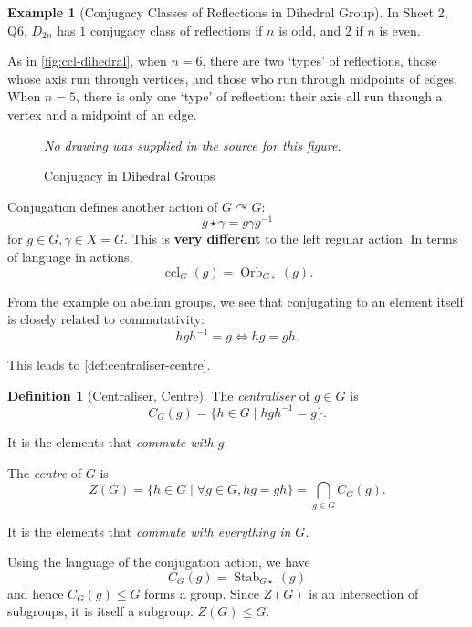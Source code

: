 \documentclass{article}
\theoremstyle{definition}
\newtheorem{definition}[theorem]{Definition}
\newtheorem*{example*}{Example}
\theoremstyle{remark}
\newcommand{\pqty}[1]{\left(#1\right)}
\newcommand{\set}[2]{\{#1\mid #2\}}
\newcommand{\inverse}{^{-1}}
\newcommand{\subgroup}{\leq}
\newcommand{\actson}{\curvearrowright}
\newcommand{\Stab}{\operatorname{Stab}}
\newcommand{\ccl}{\operatorname{ccl}}
\newcommand{\Orb}{\operatorname{Orb}}
\begin{document}
\begin{example*}[Conjugacy Classes of Reflections in Dihedral Group]
    In Sheet 2, Q6, \(D_{2n}\) has \(1\) conjugacy class of reflections if \(n\) is odd, and \(2\) if \(n\) is even.
    
    As in \autoref{fig:ccl-dihedral}, when \(n = 6\), there are two `types' of reflections, those whose axis run through vertices, and those who run through midpoints of edges. When \(n = 5\), there is only one `type' of reflection: their axis all run through a vertex and a midpoint of an edge.
\end{example*}

\begin{figure}[ht!]
    \centering
    \emph{No drawing was supplied in the source for this figure.}\par
\caption{Conjugacy in Dihedral Groups}
    \label{fig:ccl-dihedral}
\end{figure}

Conjugation defines another action of \(G \actson G\):
\[
    g \star \gamma = g \gamma g\inverse
\]
for \(g \in G, \gamma \in X = G\). This is \textbf{very different} to the left regular action. In terms of language in actions,
\[
    \ccl_{G} \pqty{g} = \Orb_{G\star} \pqty{g}.
\]

From the example on abelian groups, we see that conjugating to an element itself is closely related to commutativity:
\[
    hgh\inverse = g \iff hg = gh.
\]

This leads to \autoref{def:centraliser-centre}.

\begin{definition}[Centraliser, Centre]
    \label{def:centraliser-centre}%
    The \emph{centraliser} of \(g \in G\) is
    \[
        C_G\pqty{g} = \set{h \in G}{h g h\inverse = g}.
    \]

    It is the elements that \emph{commute with \(g\)}.

    The \emph{centre} of \(G\) is
    \[
        Z\pqty{G} = \set{h \in G}{\forall g \in G, hg = gh} = \bigcap_{g \in G} C_G \pqty{g}.
    \]

    It is the elements that \emph{commute with everything in \(G\)}.
\end{definition}

Using the language of the conjugation action, we have
\[
    C_G\pqty{g} = \Stab_{G\star} \pqty{g}
\]
and hence \(C_G\pqty{g} \subgroup G\) forms a group. Since \(Z\pqty{G}\) is an intersection of subgroups, it is itself a subgroup: \(Z\pqty{G} \subgroup G\).
\end{document}

